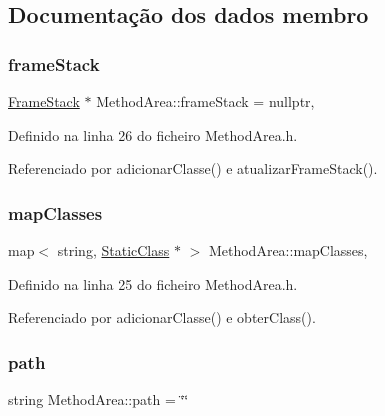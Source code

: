 \subsection{Documentação dos dados membro}
\mbox{\label{classMethodArea_a2b99453f48cbcc141b027b8e6bbb9e2d}} 
\subsubsection{\texorpdfstring{frame\+Stack}{frameStack}}
{\footnotesize\ttfamily \hyperlink{classFrameStack}{Frame\+Stack} $\ast$ Method\+Area\+::frame\+Stack = nullptr\hspace{0.3cm}{\ttfamily [static]}, {\ttfamily [private]}}



Definido na linha 26 do ficheiro Method\+Area.\+h.



Referenciado por adicionar\+Classe() e atualizar\+Frame\+Stack().

\mbox{\label{classMethodArea_ab92a54586a58ca940ecedfcc90ff8b13}} 
\subsubsection{\texorpdfstring{map\+Classes}{mapClasses}}
{\footnotesize\ttfamily map$<$ string, \hyperlink{classStaticClass}{Static\+Class} $\ast$ $>$ Method\+Area\+::map\+Classes\hspace{0.3cm}{\ttfamily [static]}, {\ttfamily [private]}}



Definido na linha 25 do ficheiro Method\+Area.\+h.



Referenciado por adicionar\+Classe() e obter\+Class().

\mbox{\label{classMethodArea_a5fba57684c1552a65932306870b1130c}} 
\subsubsection{\texorpdfstring{path}{path}}
{\footnotesize\ttfamily string Method\+Area\+::path = \char`\"{}\char`\"{}\hspace{0.3cm}{\ttfamily [static]}}



